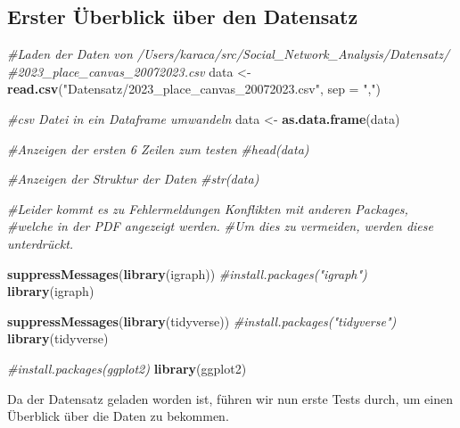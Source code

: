 \documentclass[
]{article}
\newenvironment{Shaded}{\begin{snugshade}}{\end{snugshade}}
\newcommand{\AttributeTok}[1]{\textcolor[rgb]{0.13,0.29,0.53}{#1}}
\newcommand{\CommentTok}[1]{\textcolor[rgb]{0.56,0.35,0.01}{\textit{#1}}}
\newcommand{\FunctionTok}[1]{\textcolor[rgb]{0.13,0.29,0.53}{\textbf{#1}}}
\newcommand{\NormalTok}[1]{#1}
\newcommand{\OtherTok}[1]{\textcolor[rgb]{0.56,0.35,0.01}{#1}}
\newcommand{\SpecialCharTok}[1]{\textcolor[rgb]{0.81,0.36,0.00}{\textbf{#1}}}
\newcommand{\StringTok}[1]{\textcolor[rgb]{0.31,0.60,0.02}{#1}}
\begin{document}
\subsection{Erster Überblick über den
Datensatz}\label{erster-uxfcberblick-uxfcber-den-datensatz}

\begin{Shaded}
\begin{Highlighting}[]
\CommentTok{\#Laden der Daten von  /Users/karaca/src/Social\_Network\_Analysis/Datensatz/}
                        \CommentTok{\#2023\_place\_canvas\_20072023.csv}
\NormalTok{data }\OtherTok{\textless{}{-}} \FunctionTok{read.csv}\NormalTok{(}\StringTok{"Datensatz/2023\_place\_canvas\_20072023.csv"}\NormalTok{, }\AttributeTok{sep =} \StringTok{","}\NormalTok{)}

\CommentTok{\#csv Datei in ein Dataframe umwandeln}
\NormalTok{data }\OtherTok{\textless{}{-}} \FunctionTok{as.data.frame}\NormalTok{(data)}

\CommentTok{\#Anzeigen der ersten 6 Zeilen zum testen}
\CommentTok{\#head(data)}

\CommentTok{\#Anzeigen der Struktur der Daten}
\CommentTok{\#str(data)}
\end{Highlighting}
\end{Shaded}

\begin{Shaded}
\begin{Highlighting}[]
\CommentTok{\#Leider kommt es zu Fehlermeldungen Konflikten mit anderen Packages,}
\CommentTok{\#welche in der PDF angezeigt werden.}
\CommentTok{\#Um dies zu vermeiden, werden diese unterdrückt.}

\FunctionTok{suppressMessages}\NormalTok{(}\FunctionTok{library}\NormalTok{(igraph))}
\CommentTok{\#install.packages("igraph")}
\FunctionTok{library}\NormalTok{(igraph)}

\FunctionTok{suppressMessages}\NormalTok{(}\FunctionTok{library}\NormalTok{(tidyverse))}
\CommentTok{\#install.packages("tidyverse")}
\FunctionTok{library}\NormalTok{(tidyverse)}

\CommentTok{\#install.packages(ggplot2)}
\FunctionTok{library}\NormalTok{(ggplot2)}
\end{Highlighting}
\end{Shaded}

Da der Datensatz geladen worden ist, führen wir nun erste Tests durch,
um einen Überblick über die Daten zu bekommen.

\begin{Shaded}
\end{Shaded}
\end{document}
